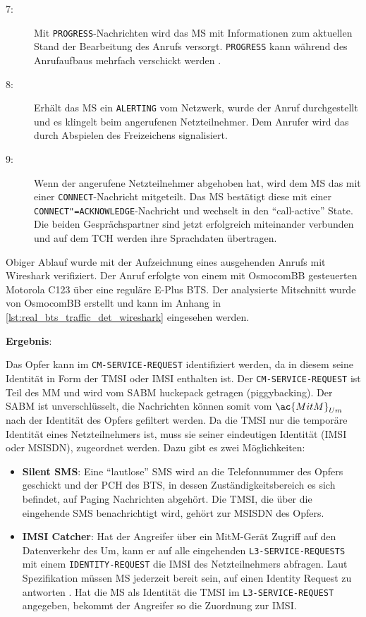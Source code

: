 \begin{description}
\item[7:] Mit \texttt{PROGRESS}-Nachrichten \citep[Kap. 9.3.17]{3gpp:24.008} wird das \ac{MS} mit Informationen zum aktuellen Stand der Bearbeitung des Anrufs versorgt. \texttt{PROGRESS} kann während des Anrufaufbaus mehrfach verschickt werden \citep[Kap. 5.5.6]{3gpp:24.008}.
\item[8:] Erhält das \ac{MS} ein \texttt{ALERTING} \citep[Kap. 5.2.1.5]{3gpp:24.008} vom Netzwerk, wurde der Anruf durchgestellt und es klingelt beim angerufenen Netzteilnehmer. Dem Anrufer wird das durch Abspielen des Freizeichens signalisiert.
\item[9:] Wenn der angerufene Netzteilnehmer abgehoben hat, wird dem \ac{MS} das mit einer \texttt{CONNECT}-Nachricht mitgeteilt. Das \ac{MS} bestätigt diese mit einer \texttt{CONNECT"=ACKNOWLEDGE}-Nachricht und wechselt in den "`call-active"' State. Die beiden Gesprächspartner sind jetzt erfolgreich miteinander verbunden und auf dem \ac{TCH} werden ihre Sprachdaten übertragen.
\end{description}
Obiger Ablauf wurde mit der Aufzeichnung eines ausgehenden Anrufs mit Wireshark verifiziert. Der Anruf erfolgte von einem mit OsmocomBB gesteuerten Motorola C123 über eine reguläre E-Plus \ac{BTS}. Der analysierte Mitschnitt wurde von OsmocomBB erstellt und kann im Anhang in \autoref{lst:real_bts_traffic_det_wireshark} eingesehen werden. 

\textbf{Ergebnis}:

Das Opfer kann im \texttt{CM-SERVICE-REQUEST} identifiziert werden, da in diesem seine Identität in Form der \ac{TMSI} oder \ac{IMSI} enthalten ist. Der \texttt{CM-SERVICE-REQUEST} ist Teil des \ac{MM} und wird vom \ac{SABM} huckepack getragen (piggybacking). Der \ac{SABM} ist unverschlüsselt, die Nachrichten können somit vom $\ac{MitM}_{Um}$ nach der Identität des Opfers gefiltert werden. Da die \ac{TMSI} nur die temporäre Identität eines Netzteilnehmers ist, muss sie seiner eindeutigen Identität (\ac{IMSI} oder \ac{MSISDN}), zugeordnet werden. Dazu gibt es zwei Möglichkeiten:
\begin{itemize}
\item \textbf{Silent \ac{SMS}}: Eine "`lautlose"' \ac{SMS} wird an die Telefonnummer des Opfers geschickt und der \ac{PCH} des \ac{BTS}, in dessen Zuständigkeitsbereich es sich befindet, auf Paging Nachrichten abgehört. Die \ac{TMSI}, die über die eingehende \ac{SMS} benachrichtigt wird, gehört zur \ac{MSISDN} des Opfers.
\item \textbf{\ac{IMSI} Catcher}: Hat der Angreifer über ein \ac{MitM}-Gerät Zugriff auf den Datenverkehr des \ac{Um}, kann er auf alle eingehenden \texttt{L3-SERVICE-REQUESTS} mit einem \texttt{IDENTITY-REQUEST} die \ac{IMSI} des Netzteilnehmers abfragen. Laut Spezifikation müssen \ac{MS} jederzeit bereit sein, auf einen Identity Request zu antworten \citep[Kap. 4.3.3.2]{3gpp:24.008}. Hat die \ac{MS} als Identität die \ac{TMSI} im \texttt{L3-SERVICE-REQUEST} angegeben, bekommt der Angreifer so die Zuordnung zur \ac{IMSI}.
\end{itemize}

